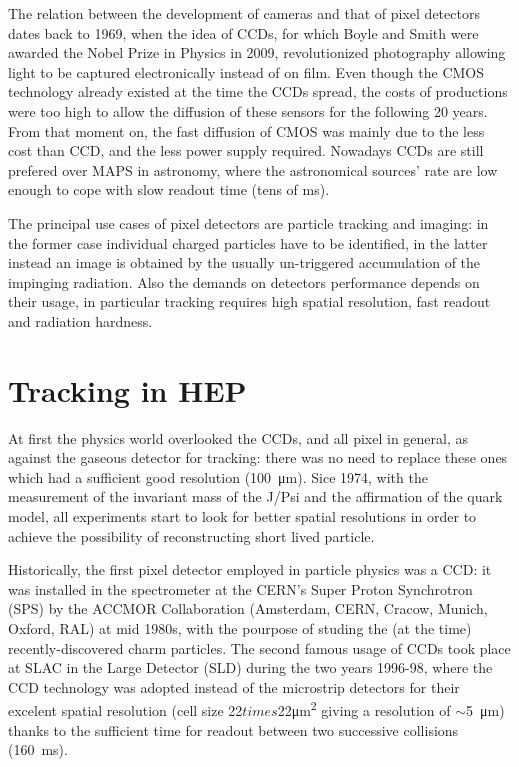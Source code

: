 The relation between the development of cameras and that of pixel detectors dates back to 1969, when the idea of CCDs, for which Boyle and Smith were awarded the Nobel Prize in Physics in 2009, revolutionized photography allowing light to be captured electronically instead of on film. 
Even though the CMOS technology already existed at the time the CCDs spread, the costs of productions were too high to allow the diffusion of these sensors for the following 20 years. From that moment on, the fast diffusion of CMOS was mainly due to the less cost than CCD, and the less power supply required. Nowadays CCDs are still prefered over MAPS in astronomy, where the astronomical sources' rate are low enough to cope with slow readout time (tens of \si{ms}).  

The principal use cases of pixel detectors are particle tracking and imaging: in the former case individual charged particles have to be identified, in the latter instead an image is obtained by the usually un-triggered accumulation of the impinging radiation. 
Also the demands on detectors performance depends on their usage, in particular tracking requires high spatial resolution, fast readout and radiation hardness. 

\section{Tracking in HEP}
    At first the physics world overlooked the CCDs, and all pixel in general, as against the gaseous detector for tracking: there was no need to replace these ones which had a sufficient good resolution (\SI{100}{\um}). Sice 1974, with the measurement of the invariant mass of the J/Psi and the affirmation of the quark model, all experiments start to look for better spatial resolutions in order to achieve the possibility of reconstructing short lived particle.  

    Historically, the first pixel detector employed in particle physics was a CCD: it was installed in the spectrometer at the CERN’s Super Proton Synchrotron (SPS) by the ACCMOR Collaboration (Amsterdam, CERN, Cracow, Munich, Oxford, RAL) at mid 1980s, with the pourpose of studing the (at the time) recently-discovered charm particles.
    The second famous usage of CCDs took place at SLAC in the Large Detector (SLD) during the two years 1996-98, where the CCD technology was adopted instead of the microstrip detectors for their excelent spatial resolution (cell size 22$times$22\si{\um\squared} giving a resolution of $\sim$\SI{5}{\um}) thanks to the sufficient time for readout between two successive collisions (\SI{160}{ms}).

